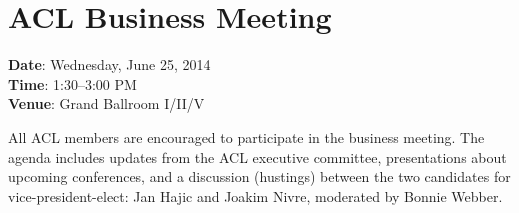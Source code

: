 \section[ACL Business Meeting]{ACL Business Meeting}
\thispagestyle{emptyheader}

\textbf{Date}: Wednesday, June 25, 2014 \\
\textbf{Time}: 1:30--3:00 PM \\
\textbf{Venue}: Grand Ballroom I/II/V

All ACL members are encouraged to participate in the business
meeting. The agenda includes updates from the ACL executive committee,
presentations about upcoming conferences, and a discussion
(hustings) between the two candidates for vice-president-elect: Jan
Hajic and Joakim Nivre, moderated by Bonnie Webber.

